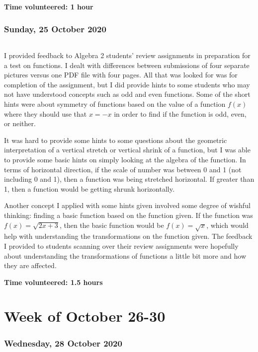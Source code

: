 \documentclass{article}
\begin{document}
\textbf{Time volunteered: 1 hour}

\section{Sunday, 25 October 2020}

\paragraph{}I provided feedback to Algebra 2 students' review assignments in preparation for a test on functions. I dealt with differences between submissions of four separate pictures versus one PDF file with four pages. All that was looked for was for completion of the assignment, but I did provide hints to some students who may not have understood concepts such as odd and even functions. Some of the short hints were about symmetry of functions based on the value of a function $f(x)$ where they should use that $x = -x$ in order to find if the function is odd, even, or neither. 

It was hard to provide some hints to some questions about the geometric interpretation of a vertical stretch or vertical shrink of a function, but I was able to provide some basic hints on simply looking at the algebra of the function. In terms of horizontal direction, if the scale of number was between 0 and 1 (not including 0 and 1), then a function was being stretched horizontal. If greater than 1, then a function would be getting shrunk horizontally. 

Another concept I applied with some hints given involved some degree of wishful thinking: finding a basic function based on the function given. If the function was $f(x) = \sqrt{2x + 3}$, then the basic function would be $f(x) = \sqrt{x}$, which would help with understanding the transformations on the function given. The feedback I provided to students scanning over their review assignments were hopefully about understanding the transformations of functions a little bit more and how they are affected.   

\textbf{Time volunteered: 1.5 hours}

\part{Week of October 26-30}
\section{Wednesday, 28 October 2020}
\end{document}
